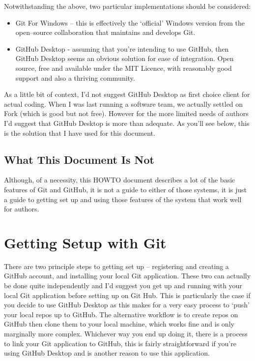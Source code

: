 \documentclass[a4paper, 12pt]{article}
\begin{document}
Notwithstanding the above, two particular implementations should be considered:
\begin{itemize}
\item Git For Windows -- this is effectively the `official' Windows version from the open--source collaboration that maintains and develops Git.
\item GitHub Desktop - assuming that you're intending to use GitHub, then GitHub Desktop seems an obvious solution for ease of integration. Open source, free and available under the MIT Licence, with reasonably good support and also a thriving community.
\end{itemize}
As a little bit of context, I'd not suggest GitHub Desktop as first choice client for actual coding. When I was last running a software team, we actually settled on Fork (which is good but not free). However for the more limited needs of authors I'd suggest that GitHub Desktop is more than adequate. As you'll see below, this is the solution that I have used for this document.

\subsection{What This Document Is Not}
Although, of a necessity, this HOWTO document describes a lot of the basic features of Git and GitHub, it is not a guide to either of those systems, it is just a guide to getting set up and using those features of the system that work well for authors.

\section{Getting Setup with Git}
There are two principle steps to getting set up -- registering and creating a GitHub account, and installing your local Git application. These two can actually be done quite independently and I'd suggest you get up and running with your local Git application before setting up on Git Hub. This is particularly the case if you decide to use GitHub Desktop as this makes for a very easy process to `push' your local repos up to GitHub. The alternative workflow is to create repos on GitHub then clone them to your local machine, which works fine and is only marginally more complex. Whichever way you end up doing it, there is a process to link your Git application to GitHub, this is fairly straightforward if you're using GitHub Desktop and is another reason to use this application.
\end{document}
